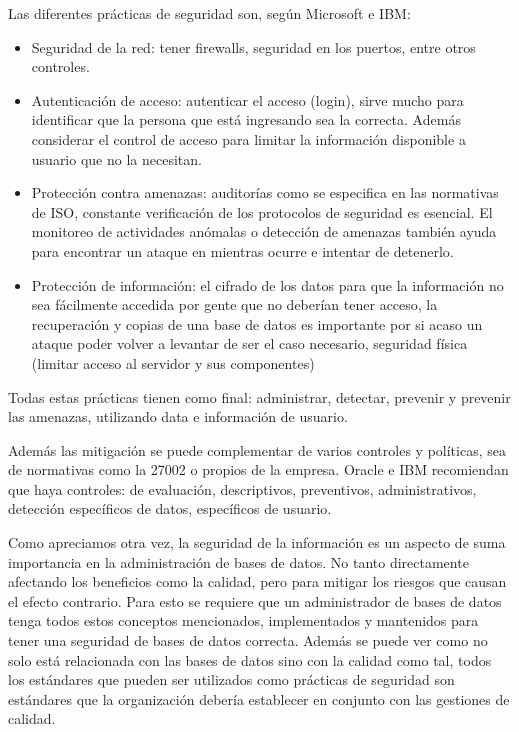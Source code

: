 \documentclass[12pt, article, natbib]{IEEEtran}
\begin{document}
Las diferentes prácticas de seguridad son, según Microsoft e IBM: 
\begin{itemize}
	\item Seguridad de la red: tener firewalls, seguridad en los puertos, entre otros controles.
	\item Autenticación de acceso: autenticar el acceso (login), sirve mucho para identificar que la persona que está ingresando sea la correcta. Además considerar el control de acceso para limitar la información disponible a usuario que no la necesitan.
	\item Protección contra amenazas: auditorías como se especifica en las normativas de ISO, constante verificación de los protocolos de seguridad es esencial. El monitoreo de actividades anómalas o detección de amenazas también ayuda para encontrar un ataque en mientras ocurre e intentar de detenerlo.
	\item Protección de información: el cifrado de los datos para que la información no sea fácilmente accedida por gente que no deberían tener acceso, la recuperación y copias de una base de datos es importante por si acaso un ataque poder volver a levantar de ser el caso necesario, seguridad física (limitar acceso al servidor y sus componentes)
\end{itemize}

Todas estas prácticas tienen como final: administrar, detectar, prevenir y prevenir las amenazas, utilizando data e información de usuario.

Además las mitigación se puede complementar de varios controles y políticas, sea de normativas como la 27002 o propios de la empresa. Oracle \cite{oracleseguridad} e IBM recomiendan que haya controles: de evaluación, descriptivos, preventivos, administrativos, detección específicos de datos, específicos de usuario.

Como apreciamos otra vez, la seguridad de la información es un aspecto de suma importancia en la administración de bases de datos. No tanto directamente afectando los beneficios como la calidad, pero para mitigar los riesgos que causan el efecto contrario. Para esto se requiere que un administrador de bases de datos tenga todos estos conceptos mencionados, implementados y mantenidos para tener una seguridad de bases de datos correcta. Además se puede ver como no solo está relacionada con las bases de datos sino con la calidad como tal, todos los estándares que pueden ser utilizados como prácticas de seguridad son estándares que la organización debería establecer en conjunto con las gestiones de calidad.
\end{document}
